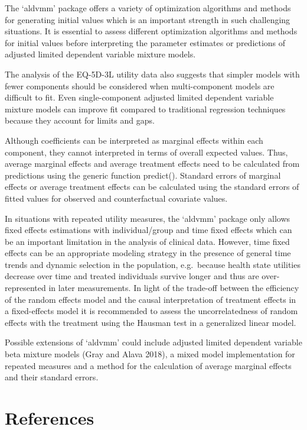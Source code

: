 \documentclass[
]{article}
\begin{document}
The `aldvmm' package offers a variety of optimization algorithms and methods for generating initial values which is an important strength in such challenging situations. It is essential to assess different optimization algorithms and methods for initial values before interpreting the parameter estimates or predictions of adjusted limited dependent variable mixture models.

The analysis of the EQ-5D-3L utility data also suggests that simpler models with fewer components should be considered when multi-component models are difficult to fit. Even single-component adjusted limited dependent variable mixture models can improve fit compared to traditional regression techniques because they account for limits and gaps.

Although coefficients can be interpreted as marginal effects within each component, they cannot interpreted in terms of overall expected values. Thus, average marginal effects and average treatment effects need to be calculated from predictions using the generic function predict(). Standard errors of marginal effects or average treatment effects can be calculated using the standard errors of fitted values for observed and counterfactual covariate values.

In situations with repeated utility measures, the `aldvmm' package only allows fixed effects estimations with individual/group and time fixed effects which can be an important limitation in the analysis of clinical data. However, time fixed effects can be an appropriate modeling strategy in the presence of general time trends and dynamic selection in the population, e.g.~because health state utilities decrease over time and treated individuals survive longer and thus are over-represented in later measurements. In light of the trade-off between the efficiency of the random effects model and the causal interpretation of treatment effects in a fixed-effects model it is recommended to assess the uncorrelatedness of random effects with the treatment using the Hausman test in a generalized linear model.

Possible extensions of `aldvmm' could include adjusted limited dependent variable beta mixture models (Gray and Alava 2018), a mixed model implementation for repeated measures and a method for the calculation of average marginal effects and their standard errors.

\newpage

\hypertarget{references}{%
\section{References}\label{references}}
\end{document}
